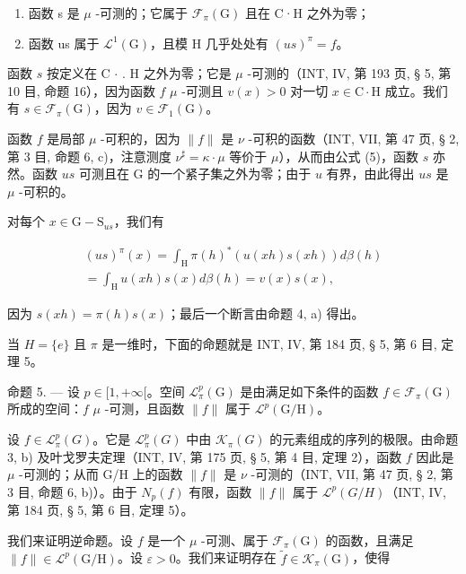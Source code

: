 \begin{enumerate}
\def\labelenumi{\alph{enumi})}
\item
  函数 s 是 \(\mu\) -可测的；它属于 \(\mathcal{F}_{\pi}(\mathrm{G})\) 且在 C·H 之外为零；
\item
  函数 us 属于 \(\mathcal{L}^1 (\mathrm{G})\)，且模 H 几乎处处有 \((us)^{\pi} = f\)。
\end{enumerate}

函数 \(s\) 按定义在 C \(\cdot\) . H 之外为零；它是 \(\mu\) -可测的（INT, IV, 第 193 页, § 5, 第 10 目, 命题 16），因为函数 \(f\) \(\mu\) -可测且 \(v(x) > 0\) 对一切 \(x \in \mathrm{C} \cdot \mathrm{H}\) 成立。我们有 \(s \in \mathcal{F}_{\pi}(\mathrm{G})\)，因为 \(v \in \mathcal{F}_1(\mathrm{G})\)。

函数 \(f\) 是局部 \(\mu\) -可积的，因为 \(\|f\|\) 是 \(\nu\) -可积的函数（INT, VII, 第 47 页, § 2, 第 3 目, 命题 6, c)，注意测度 \(\nu^{\sharp} = \kappa \cdot \mu\) 等价于 \(\mu\)），从而由公式 (5)，函数 \(s\) 亦然。函数 \(us\) 可测且在 G 的一个紧子集之外为零；由于 \(u\) 有界，由此得出 \(us\) 是 \(\mu\) -可积的。

对每个 \(x\in \mathrm{G - S}_{us}\)，我们有

\[
\begin{array}{c} (u s) ^ {\pi} (x) = \int_ {\mathrm{H}} \pi (h) ^ {*} (u (x h) s (x h)) d \beta (h) \\ = \int_ {\mathrm{H}} u (x h) s (x) d \beta (h) = v (x) s (x), \end{array}
\]

因为 \(s(xh) = \pi(h)s(x)\)；最后一个断言由命题 4, a) 得出。

当 \(H = \{e\}\) 且 \(\pi\) 是一维时，下面的命题就是 INT, IV, 第 184 页, § 5, 第 6 目, 定理 5。

命题 5. --- 设 \(p \in [1, +\infty[\)。空间 \(\mathcal{L}_{\pi}^{p}(\mathrm{G})\) 是由满足如下条件的函数 \(f \in \mathcal{F}_{\pi}(\mathrm{G})\) 所成的空间：\(f\) \(\mu\) -可测，且函数 \(\|f\|\) 属于 \(\mathcal{L}^{p}(\mathrm{G}/\mathrm{H})\)。

设 \(f \in \mathcal{L}_{\pi}^{p}(G)\)。它是 \(\mathcal{L}_{\pi}^{p}(G)\) 中由 \(\mathcal{K}_{\pi}(G)\) 的元素组成的序列的极限。由命题 3, b) 及叶戈罗夫定理（INT, IV, 第 175 页, § 5, 第 4 目, 定理 2），函数 \(f\) 因此是 \(\mu\) -可测的；从而 G/H 上的函数 \(\|f\|\) 是 \(\nu\) -可测的（INT, VII, 第 47 页, § 2, 第 3 目, 命题 6, b)）。由于 \(N_{p}(f)\) 有限，函数 \(\|f\|\) 属于 \(\mathcal{L}^{p}(G/H)\)（INT, IV, 第 184 页, § 5, 第 6 目, 定理 5）。

 我们来证明逆命题。设 \(f\) 是一个 \(\mu\) -可测、属于 \(\mathcal{F}_{\pi}(\mathrm{G})\) 的函数，且满足 \(\|f\|\in\mathcal{L}^{p}(\mathrm{G}/\mathrm{H})\)。设 \(\varepsilon>0\)。我们来证明存在 \(\widetilde{f}\in\mathcal{K}_{\pi}(\mathrm{G})\)，使得

